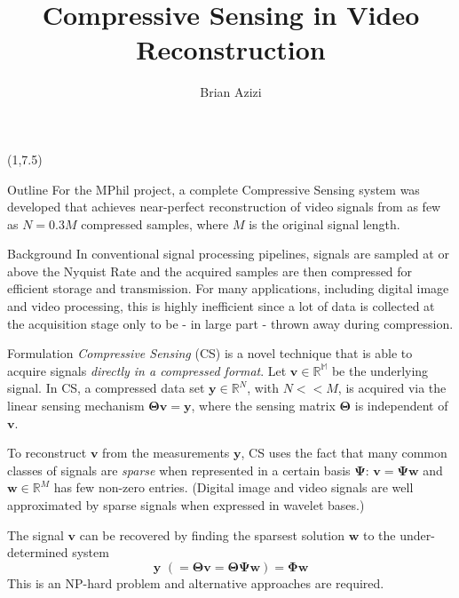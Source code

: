 \documentclass[final]{beamer}
\title{Compressive Sensing in Video Reconstruction}
\author{Brian Azizi}
\begin{document}
\begin{frame}{} 

\begin{textblock}{19.5}(1,7.5)
\begin{block}{Outline}
For the MPhil project, a complete Compressive Sensing system was developed that achieves near-perfect reconstruction of video signals from as few as $N = 0.3M$ compressed samples, where $M$ is the original signal length.
\end{block}

\begin{block}{Background}
In conventional signal processing pipelines, signals are sampled at or above the Nyquist Rate and the acquired samples are then compressed for efficient storage and transmission.
For many applications, including digital image and video processing, this is highly inefficient since a lot of data is collected at the acquisition stage only to be - in large part - thrown away during compression.

\end{block}

\begin{block}{Formulation}
\emph{Compressive Sensing} (CS) \cite{candes2006,donoho2006} is a novel technique that is able to acquire signals \emph{directly in a compressed format}.
Let $\bm v \in \mathbb{R^M}$ be the underlying signal.
In CS, a compressed data set $\bm y \in\mathbb{R}^N$, with $N<<M$, is acquired
 via the linear sensing mechanism $\bm\Theta\bm v = \bm y$, where the sensing matrix $\bm\Theta$ is independent of $\bm v$.

To reconstruct $\bm v$ from the measurements $\bm y$, CS uses the fact that many common classes of signals are \emph{sparse}
when represented in a certain basis $\bm\Psi$: $\bm v = \bm\Psi\bm w$ and $\bm w\in\mathbb{R}^M$ has few non-zero entries.
(Digital image and video signals are well approximated by sparse signals when expressed in wavelet bases.)

The signal $\bm v$ can be recovered by finding the sparsest solution $\bm w$ to the under-determined system
\begin{equation*}
  \bm y\,\, (=\bm\Theta\bm v = \bm\Theta\bm\Psi\bm w )= \bm\Phi\bm w 
\end{equation*}
This is an NP-hard problem and alternative approaches are required.
\end{block}
\end{textblock}


\end{frame}
\end{document}
